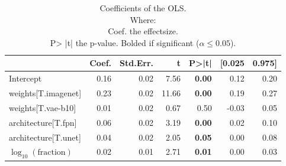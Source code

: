 \begin{table}[ht]
\centering
\caption{Coefficients of the OLS.\\Where:\\\hphantom{tabb}Coef. the effectsize.\\\hphantom{tabb}P> |t| the p-value. Bolded if significant ($\alpha\leq0.05$).}
\label{tab:data_fraction_parameter_influence}
\begin{tabular}{lrrrrrr}
\toprule
 & Coef. & Std.Err. & t & P>|t| & [0.025 & 0.975] \\
\midrule
Intercept & 0.16 & 0.02 & 7.56 & \textbf{0.00} & 0.12 & 0.20 \\
weights[T.imagenet] & 0.23 & 0.02 & 11.66 & \textbf{0.00} & 0.19 & 0.27 \\
weights[T.vae-b10] & 0.01 & 0.02 & 0.67 & 0.50 & -0.03 & 0.05 \\
architecture[T.fpn] & 0.06 & 0.02 & 3.19 & \textbf{0.00} & 0.02 & 0.10 \\
architecture[T.unet] & 0.04 & 0.02 & 2.05 & \textbf{0.05} & 0.00 & 0.08 \\
$\log_{10}(\text{fraction})$ & 0.02 & 0.01 & 2.71 & \textbf{0.01} & 0.00 & 0.03 \\
\bottomrule
\end{tabular}
\end{table}
